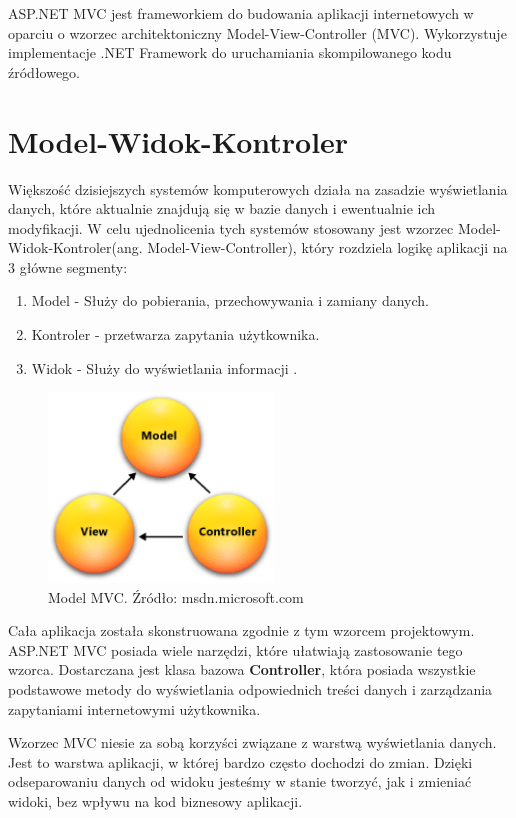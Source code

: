 ASP.NET MVC jest frameworkiem do budowania aplikacji internetowych w oparciu o wzorzec architektoniczny Model-View-Controller (MVC). Wykorzystuje implementacje .NET Framework do uruchamiania skompilowanego kodu źródłowego.


\section{Model-Widok-Kontroler}
\label{section_Kontro}
Większość dzisiejszych systemów komputerowych działa na zasadzie wyświetlania danych, które aktualnie znajdują się w bazie danych i ewentualnie ich modyfikacji. W celu ujednolicenia tych systemów stosowany jest wzorzec Model-Widok-Kontroler(ang. Model-View-Controller), który rozdziela logikę aplikacji na 3 główne segmenty:
\begin{enumerate}
	\item Model - Służy do pobierania, przechowywania i zamiany danych.
	\item Kontroler - przetwarza zapytania użytkownika.
	\item Widok - Służy do wyświetlania informacji .
\end{enumerate}

\begin{figure}[h]
	\centering
	\includegraphics[height=50.5mm]{images/mvc.png}
	 \caption{Model MVC. Źródło: msdn.microsoft.com}
\end{figure}

Cała aplikacja została skonstruowana zgodnie z tym wzorcem projektowym. ASP.NET MVC posiada wiele narzędzi, które ułatwiają zastosowanie tego wzorca. Dostarczana jest klasa bazowa \textbf{Controller}, która posiada wszystkie podstawowe metody do wyświetlania odpowiednich treści danych i zarządzania zapytaniami internetowymi użytkownika.

Wzorzec MVC niesie za sobą korzyści związane z warstwą wyświetlania danych. Jest to warstwa aplikacji, w której bardzo często dochodzi do zmian. Dzięki odseparowaniu danych od widoku jesteśmy w stanie tworzyć, jak i zmieniać widoki, bez wpływu na kod biznesowy aplikacji.

